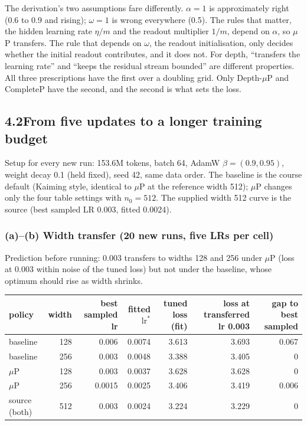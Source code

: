\documentclass[10pt,letterpaper]{article}
\newcommand{\muP}{$\mu$P}
\newcommand{\lrs}{\ensuremath{\mathrm{lr}^{*}}}
\begin{document}
The derivation's two assumptions fare differently. $\alpha=1$ is approximately right (0.6 to 0.9 and rising); $\omega=1$ is wrong everywhere (0.5). The rules that matter, the hidden learning rate $\eta/m$ and the readout multiplier $1/m$, depend on $\alpha$, so \muP{} transfers. The rule that depends on $\omega$, the readout initialisation, only decides whether the initial readout contributes, and it does not. For depth, ``transfers the learning rate'' and ``keeps the residual stream bounded'' are different properties. All three prescriptions have the first over a doubling grid. Only Depth-\muP{} and CompleteP have the second, and the second is what sets the loss.

\subsection*{4.2\quad From five updates to a longer training budget}

Setup for every new run: 153.6M tokens, batch 64, AdamW $\beta=(0.9,0.95)$, weight decay 0.1 (held fixed), seed 42, same data order. The baseline is the course default (Kaiming style, identical to \muP{} at the reference width 512); \muP{} changes only the four table settings with $n_0=512$. The supplied width 512 curve is the source (best sampled LR 0.003, fitted 0.0024).

\subsubsection*{(a)--(b) Width transfer (20 new runs, five LRs per cell)}

Prediction before running: 0.003 transfers to widths 128 and 256 under \muP{} (loss at 0.003 within noise of the tuned loss) but not under the baseline, whose optimum should rise as width shrinks.

\begin{table}[H]\centering\small
\begin{tabular}{lrrrrrr}\toprule
policy & width & best sampled lr & fitted $\lrs$ & tuned loss (fit) & loss at transferred lr 0.003 & gap to best sampled\\\midrule
baseline & 128 & 0.006 & 0.0074 & 3.613 & 3.693 & 0.067\\
baseline & 256 & 0.003 & 0.0048 & 3.388 & 3.405 & 0\\
\muP & 128 & 0.003 & 0.0037 & 3.628 & 3.628 & 0\\
\muP & 256 & 0.0015 & 0.0025 & 3.406 & 3.419 & 0.006\\
source (both) & 512 & 0.003 & 0.0024 & 3.224 & 3.229 & 0\\\bottomrule
\end{tabular}
\end{table}
\end{document}
